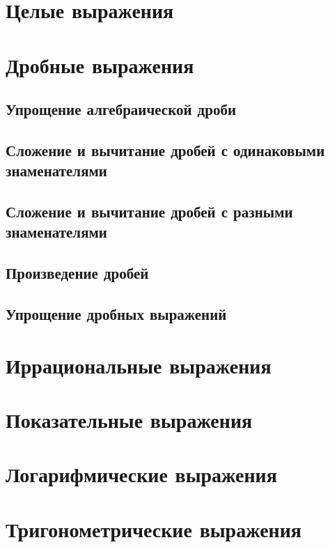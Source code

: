 \documentclass[10pt, a4paper]{article}
\begin{document}
\section{Целые выражения}
\section{Дробные выражения}
	\subsection{Упрощение алгебраической дроби}
	\subsection{Сложение и вычитание дробей с одинаковыми знаменателями}
	\subsection{Сложение и вычитание дробей с разными знаменателями}
	\subsection{Произведение дробей}
	\subsection{Упрощение дробных выражений}
\section{Иррациональные выражения}
\section{Показательные выражения}
\section{Логарифмические выражения}
\section{Тригонометрические выражения}
	
\end{document}
